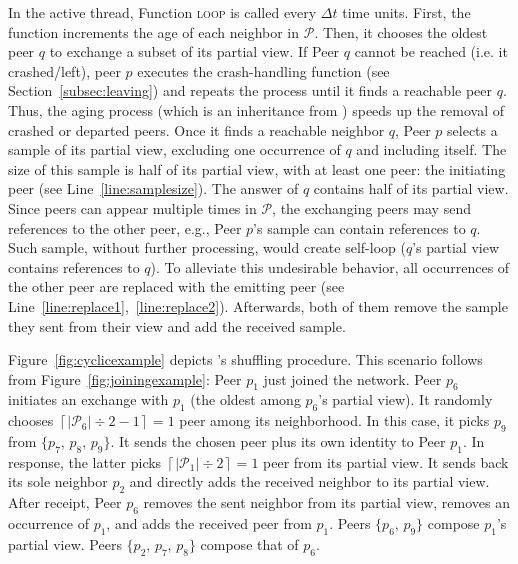 In the active thread, Function \textsc{loop} is called every $\Delta t$ time
units. First, the function increments the age of each neighbor in
$\mathcal{P}$. Then, it chooses the oldest peer $q$ to exchange a
subset of its partial view. If Peer $q$ cannot be reached (i.e. it
crashed/left), peer $p$ executes the crash-handling function
(see Section~\ref{subsec:leaving}) and repeats the process until it
finds a reachable peer $q$. Thus, the aging process (which is an
inheritance from \CYCLON) speeds up the removal of crashed or departed
peers. Once it finds a reachable neighbor $q$, Peer $p$ selects a
sample of its partial view, excluding one occurrence of $q$ and
including itself. The size of this sample is half of its partial view,
with at least one peer: the initiating peer
(see Line~\ref{line:samplesize}). The answer of $q$ contains half of
its partial view. Since peers can appear multiple times in
$\mathcal{P}$, the exchanging peers may send references to the other
peer, e.g., Peer $p$'s sample can contain references to $q$. Such
sample, without further processing, would create self-loop ($q$'s
partial view contains references to $q$). To alleviate this
undesirable behavior, all occurrences of the other peer are replaced
with the emitting peer
(see Line~\ref{line:replace1},~\ref{line:replace2}).  Afterwards, both
of them remove the sample they sent from their view and add the
received sample.

\begin{figure*}
  \centering
  \hspace{10pt}
  \hspace{10pt}
  \caption{\label{fig:cyclicexample}Example of the \SPRAY's shuffling
    protocol. }
\end{figure*}

Figure~\ref{fig:cyclicexample} depicts \SPRAY's shuffling procedure. This
scenario follows from Figure~\ref{fig:joiningexample}: Peer $p_1$ just joined
the network. Peer $p_6$ initiates an exchange with $p_1$ (the oldest among 
$p_6$'s partial view). It randomly chooses
$\left\lceil{|\mathcal{P}_6|\div 2} - 1 \right \rceil = 1$ peer among its
neighborhood. In this case, it picks $p_9$ from $\{p_7,\,p_8,\,p_9\}$.  It sends
the chosen peer plus its own identity to Peer $p_1$. In response, the latter
picks $\left\lceil{|\mathcal{P}_1|\div 2}\right\rceil = 1$ peer from its partial
view. It sends back its sole neighbor $p_2$ and directly adds the received
neighbor to its partial view. After receipt, Peer $p_6$ removes the sent
neighbor from its partial view, removes an occurrence of $p_1$, and adds the
received peer from $p_1$. Peers $\{p_6,\,p_9\}$ compose $p_1$'s partial
view. Peers $\{p_2,\,p_7,\,p_8\}$ compose that of $p_6$.

